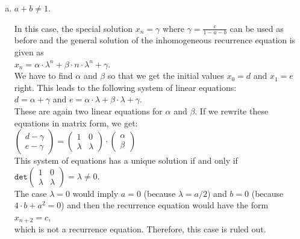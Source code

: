 \begin{enumerate}[(a)]
\item $a + b \not = 1$.

      In this case, the special solution $x_n = \gamma$ where $\gamma = \frac{c}{1 - a - b}$ can be used as
      before and the general solution of the inhomogeneous recurrence equation is given as
      \\[0.2cm]
      \hspace*{1.3cm}
      $x_n = \alpha \cdot \lambda^n + \beta \cdot n \cdot \lambda^n + \gamma$.
      \\[0.2cm]
      We have to find $\alpha$ and $\beta$ so that we get the initial values $x_0 = d$ and $x_1 = e$ right.
      This leads to the following system of linear equations:
      \\[0.2cm]
      \hspace*{1.3cm}
      $d = \alpha + \gamma$ \quad and \quad $e = \alpha \cdot \lambda + \beta \cdot \lambda + \gamma$.
      \\[0.2cm]
      These are again two linear equations for $\alpha$ and $\beta$.
      If we rewrite these equations in matrix form, we get:
      \\[0.2cm]
      \hspace*{1.3cm}
      $
      \left(\begin{array}{c}
             d - \gamma \\
             e - \gamma
            \end{array}
      \right) =
      \left(
        \begin{array}{cc}
          1 & 0 \\
          \lambda & \lambda
        \end{array}
      \right) \cdot
      \left(
        \begin{array}{c}
          \alpha \\
          \beta
        \end{array}
      \right)
      $
      \\[0.2cm]
      This system of equations has a unique solution if and only if
      \\[0.2cm]
      \hspace*{1.3cm}
            $\texttt{det}\left(
              \begin{array}{cc}
                1       & 0        \\
                \lambda & \lambda
              \end{array}
               \right) = \lambda \not= 0$.
      \\[0.2cm]
      The case $\lambda = 0$ would imply $a = 0$ (because $\lambda = a/2$) and $b = 0$ (because $4 \cdot b + a^2 = 0$)
      and then the recurrence equation would have the form
      \\[0.2cm]
      \hspace*{1.3cm}
      $x_{n+2} = c$,
      \\[0.2cm]
      which is not a recurrence equation.  Therefore, this case is ruled out.
      

\end{enumerate}

